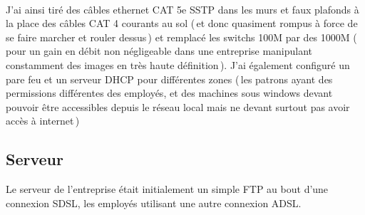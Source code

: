 \documentclass[10pt]{article}
\begin{document}
  ~

  J’ai ainsi tiré des câbles ethernet CAT 5e SSTP dans les murs et faux plafonds à la place des câbles CAT 4 courants au sol (\,et donc quasiment rompus à force de se faire marcher et rouler dessus\,) et remplacé les switchs 100M par des 1000M (\,pour un gain en débit non négligeable dans une entreprise manipulant constamment des images en très haute définition\,). J’ai également configuré un pare feu et un serveur DHCP pour différentes zones (\,les patrons ayant des permissions différentes des employés, et des machines sous windows devant pouvoir être accessibles depuis le réseau local mais ne devant surtout pas avoir accès à internet\,)

  \subsection*{Serveur}
  Le serveur de l’entreprise était initialement un simple FTP au bout d’une connexion SDSL, les employés utilisant une autre connexion ADSL.

  \,
\end{document}
